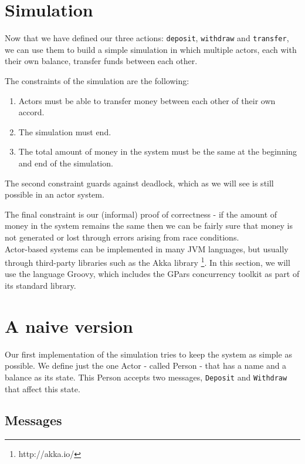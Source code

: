 \documentclass[a4paper,12pt]{kth-mag}
\begin{document}
\section{Simulation}

Now that we have defined our three actions: \texttt{deposit}, \texttt{withdraw} and \texttt{transfer}, we can use them to build a simple simulation in which multiple actors, each with their own balance, transfer funds between each other. 

The constraints of the simulation are the following:

\begin{enumerate}
\item Actors must be able to transfer money between each other of their own accord.
\item The simulation must end.
\item The total amount of money in the system must be the same at the beginning and end of the simulation.
\end{enumerate}

The second constraint guards against deadlock, which as we will see is still possible in an actor system.

The final constraint is our (informal) proof of correctness - if the amount of money in the system remains the same then we can be fairly sure that money is not generated or lost through errors arising from race conditions. \\

Actor-based systems can be implemented in many JVM languages, but usually through third-party libraries such as the Akka library \footnote{http://akka.io/}. In this section, we will use the language Groovy, which includes the GPars concurrency toolkit as part of its standard library.

\section{A naive version}

Our first implementation of the simulation tries to keep the system as simple as possible. We define just the one Actor - called Person - that has a name and a balance as its state. This Person accepts two messages, \texttt{Deposit} and \texttt{Withdraw} that affect this state. 

\subsection{Messages}
\end{document}
